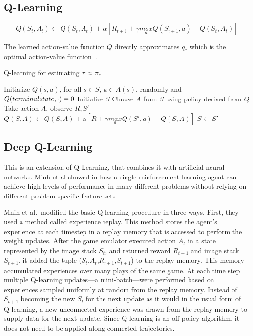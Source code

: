 \documentclass[letterpaper, 10 pt]{IEEEconf}
\begin{document}
\subsection{Q-Learning}

$$
	Q (S_t, A_t) \leftarrow Q(S_t, A_t) + \alpha \left[ R_{t+1} + \gamma \underset{a}{max} Q(S_{t+1}, a) - Q(S_t, A_t) \right]
$$

The learned action-value function $Q$ directly approximates $q_*$
which is the optimal action-value function~\cite{sutton2018reinforcement}.

\begin{algorithm}
	\caption{Q-learning for estimating $\pi \approx \pi_*$}
	\begin{algorithmic}[1]
		\State Initialize $Q(s, a)$, for all $s \in \mathit{S}$, $a \in \mathit{A}(s)$, randomly and $Q(terminal\-state, \cdot)=0$
		\State Initialize $S$
		\State Choose $A$ from $S$ using policy derived from $Q$
		\State Take action $A$, observe $R, S'$
		\State $Q (S, A) \leftarrow Q(S, A) + \alpha \left[ R + \gamma \underset{a}{max} Q(S', a) - Q(S, A) \right]$
		\State $S \leftarrow S'$
		\EndIf
		\EndIf
	\end{algorithmic}
\end{algorithm}

\subsection{Deep Q-Learning}

This is an extension of Q-Learning, that combines it with artificial
neural networks. Minh et al showed in \cite{minh_dqn} how a single
reinforcement learning agent can achieve high levels of performance in
many different problems without relying on different problem-specific
feature sets.

Mnih et al.\ modified the basic Q-learning procedure in three
ways. First, they used a method called experience replay. This method
stores the agent’s experience at each timestep in a replay memory that
is accessed to perform the weight updates. After the game emulator
executed action $A_t$ in a state represented by the image stack $S_t$,
and returned reward $R_{t+1}$ and image stack $S_{t+1}$, it added the
tuple ($S_t$,$A_t$,$R_{t+1}$,$S_{t+1}$) to the replay memory. This
memory accumulated experiences over many plays of the same game. At
each time step multiple Q-learning updates—a mini-batch—were performed
based on experiences sampled uniformly at random from the replay
memory. Instead of $S_{t+1}$ becoming the new $S_t$ for the next
update as it would in the usual form of Q-learning, a new unconnected
experience was drawn from the replay memory to supply data for the
next update. Since Q-learning is an off-policy algorithm, it does not
need to be applied along connected trajectories.
\end{document}
